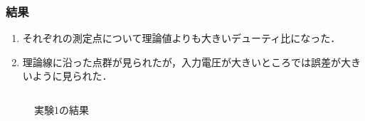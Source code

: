 \documentclass[mathsans]{beamer} %
\begin{document}
\begin{frame}
  \frametitle{結果}
  \begin{enumerate}[実験\arabic*.]
    \item それぞれの測定点について理論値よりも大きいデューティ比になった．
    \item 理論線に沿った点群が見られたが，入力電圧が大きいところでは誤差が大きいように見られた．
  \end{enumerate}
  \begin{columns}
    \begin{column}{.5\linewidth}

      \begin{figure}[htbp]
        \begin{center}
          \caption{実験1の結果}\label{fig:exp_add_comp}
        \end{center}
      \end{figure}
    \end{column}
    \begin{column}{.5\linewidth}


\end{column}
\end{columns}
\end{frame}
\end{document}
